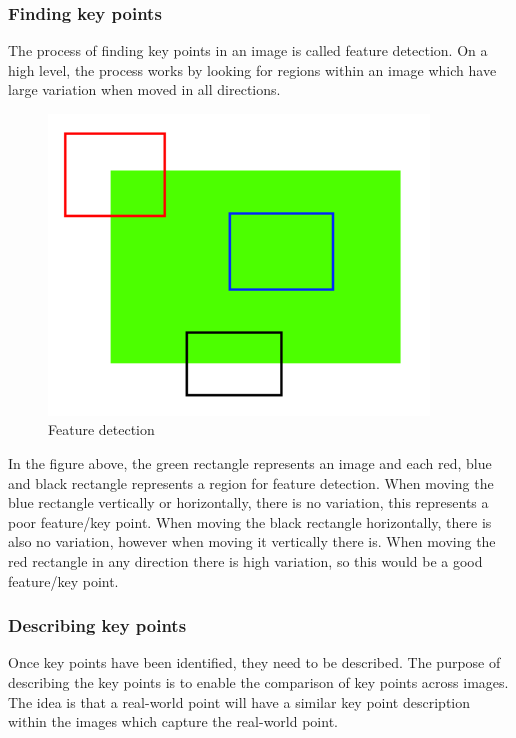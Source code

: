 \documentclass[11pt,a4paper]{report}
\begin{document}
				\subsubsection{Finding key points}
					The process of finding key points in an image is called feature detection. On a high level, the process works by looking for regions within an image which have large variation when moved in all directions.
					
					\begin{figure}[h!]
						\centering
						\includegraphics[width=0.9\textwidth]{feature_detection}
						\caption{Feature detection}
					\end{figure}
					
					In the figure above, the green rectangle represents an image and each red, blue and black rectangle represents a region for feature detection. When moving the blue rectangle vertically or horizontally, there is no variation, this represents a poor feature/key point. When moving the black rectangle horizontally, there is also no variation, however when moving it vertically there is. When moving the red rectangle in any direction there is high variation, so this would be a good feature/key point.
				\subsubsection{Describing key points}
					Once key points have been identified, they need to be described. The purpose of describing the key points is to enable the comparison of key points across images. The idea is that a real-world point will have a similar key point description within the images which capture the real-world point.
					
\end{document}

